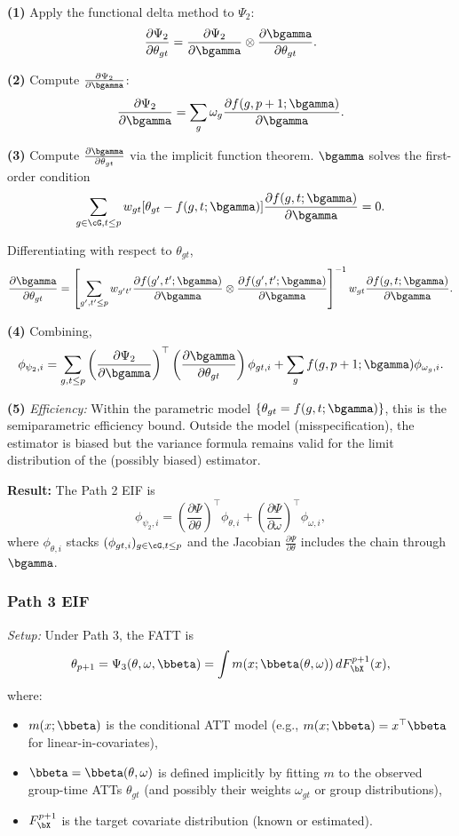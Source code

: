 \documentclass{article}
\begin{document}
\textbf{(1)} Apply the functional delta method to $\Psi_2$:
\[
\frac{\partial \Psi_2}{\partial \theta_{gt}} = \frac{\partial \Psi_2}{\partial \bgamma} \otimes \frac{\partial \bgamma}{\partial \theta_{gt}}.
\]

\textbf{(2)} Compute $\frac{\partial \Psi_2}{\partial \bgamma}$:
\[
\frac{\partial \Psi_2}{\partial \bgamma} = \sum_{g} \omega_g \frac{\partial f(g,p+1;\bgamma)}{\partial \bgamma}.
\]

\textbf{(3)} Compute $\frac{\partial \bgamma}{\partial \theta_{gt}}$ via the implicit function theorem. $\bgamma$ solves the first-order condition
\[
\sum_{g \in \cG, t \leq p} w_{gt} [\theta_{gt} - f(g,t;\bgamma)] \frac{\partial f(g,t;\bgamma)}{\partial \bgamma} = 0.
\]

Differentiating with respect to $\theta_{gt}$,
\[
\frac{\partial \bgamma}{\partial \theta_{gt}} = \left[\sum_{g',t' \leq p} w_{g't'} \frac{\partial f(g',t';\bgamma)}{\partial \bgamma} \otimes \frac{\partial f(g',t';\bgamma)}{\partial \bgamma}\right]^{-1} w_{gt} \frac{\partial f(g,t;\bgamma)}{\partial \bgamma}.
\]

\textbf{(4)} Combining,
\[
\phi_{\psi_2,i} = \sum_{g,t \leq p} \left(\frac{\partial \Psi_2}{\partial \bgamma}\right)^\top \left(\frac{\partial \bgamma}{\partial \theta_{gt}}\right) \phi_{gt,i} + \sum_g f(g,p+1;\bgamma) \phi_{\omega_g,i}.
\]

\textbf{(5)} \textit{Efficiency:} Within the parametric model $\{\theta_{gt} = f(g,t;\bgamma)\}$, this is the semiparametric efficiency bound. Outside the model (misspecification), the estimator is biased but the variance formula remains valid for the limit distribution of the (possibly biased) estimator.

\textbf{Result:} The Path 2 EIF is
\[
\phi_{\psi_2,i} = \left(\frac{\partial \Psi}{\partial \theta}\right)^\top \phi_{\theta,i} + \left(\frac{\partial \Psi}{\partial \omega}\right)^\top \phi_{\omega,i},
\]
where $\phi_{\theta,i}$ stacks $(\phi_{gt,i})_{g \in \cG, t \leq p}$ and the Jacobian $\frac{\partial \Psi}{\partial \theta}$ includes the chain through $\bgamma$.

\subsubsection{Path 3 EIF}\label{app:eif3}

\textit{Setup:} Under Path 3, the FATT is
\[
\theta_{p+1} = \Psi_3(\theta, \omega, \bbeta) = \int m(x; \bbeta(\theta, \omega)) \, dF_{\bX}^{p+1}(x),
\]
where:
\begin{itemize}
\item $m(x;\bbeta)$ is the conditional ATT model (e.g., $m(x;\bbeta) = x^\top \bbeta$ for linear-in-covariates),
\item $\bbeta = \bbeta(\theta, \omega)$ is defined implicitly by fitting $m$ to the observed group-time ATTs $\theta_{gt}$ (and possibly their weights $\omega_{gt}$ or group distributions),
\item $F_{\bX}^{p+1}$ is the target covariate distribution (known or estimated).
\end{itemize}
\end{document}
